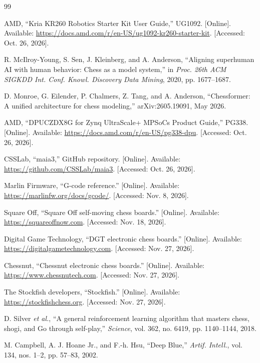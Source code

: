 \documentclass[10pt]{article}
\begin{document}
\begin{thebibliography}{99}
\small
\setlength{\itemsep}{0.15em}

 AMD, ``Kria KR260 Robotics Starter Kit User Guide,'' UG1092. [Online]. Available:
\url{https://docs.amd.com/r/en-US/ug1092-kr260-starter-kit}. [Accessed: Oct. 26, 2026].

 R. McIlroy-Young, S. Sen, J. Kleinberg, and A. Anderson, ``Aligning superhuman AI
with human behavior: Chess as a model system,'' in \emph{Proc. 26th ACM SIGKDD Int. Conf. Knowl.
Discovery Data Mining}, 2020, pp. 1677--1687.

 D. Monroe, G. Eilender, P. Chalmers, Z. Tang, and A. Anderson, ``Chessformer:
A unified architecture for chess modeling,'' arXiv:2605.19091, May 2026.

 AMD, ``DPUCZDX8G for Zynq UltraScale+ MPSoCs Product Guide,'' PG338. [Online].
Available: \url{https://docs.amd.com/r/en-US/pg338-dpu}. [Accessed: Oct. 26, 2026].

 CSSLab, ``maia3,'' GitHub repository. [Online]. Available:
\url{https://github.com/CSSLab/maia3}. [Accessed: Oct. 26, 2026].

 Marlin Firmware, ``G-code reference.'' [Online]. Available:
\url{https://marlinfw.org/docs/gcode/}. [Accessed: Nov. 8, 2026].

 Square Off, ``Square Off self-moving chess boards.'' [Online]. Available:
\url{https://squareoffnow.com}. [Accessed: Nov. 18, 2026].

 Digital Game Technology, ``DGT electronic chess boards.'' [Online]. Available:
\url{https://digitalgametechnology.com}. [Accessed: Nov. 27, 2026].

 Chessnut, ``Chessnut electronic chess boards.'' [Online]. Available:
\url{https://www.chessnutech.com}. [Accessed: Nov. 27, 2026].

 The Stockfish developers, ``Stockfish.'' [Online]. Available:
\url{https://stockfishchess.org}. [Accessed: Nov. 27, 2026].

 D. Silver \emph{et al.}, ``A general reinforcement learning algorithm that
masters chess, shogi, and Go through self-play,'' \emph{Science}, vol. 362, no. 6419,
pp. 1140--1144, 2018.

 M. Campbell, A. J. Hoane Jr., and F.-h. Hsu, ``Deep Blue,'' \emph{Artif.
Intell.}, vol. 134, nos. 1--2, pp. 57--83, 2002.


\end{thebibliography}
\end{document}
